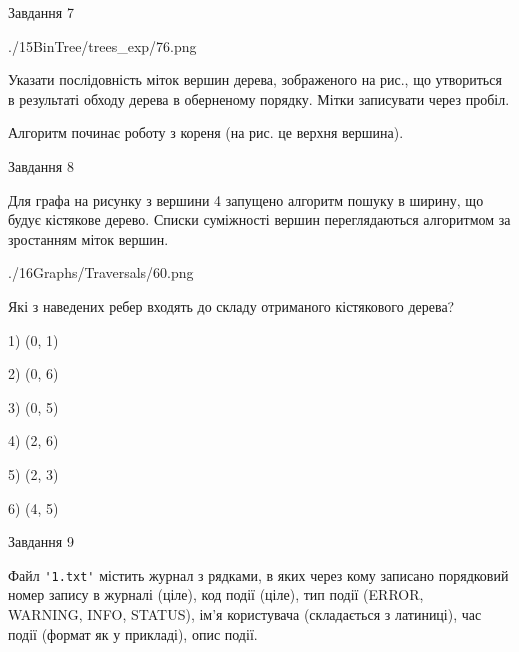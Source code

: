 \documentclass[12pt, ukrainian]{article}
\def\code#1{\Verb!#1!}
\begin{document}
{\vspace{10mm}\par

\newpage
\begin{minipage}[t]{9.7cm}
               
{\begin{center}Завдання {7}\end{center}}
\vspace{-6mm}

\begin{center}
	{./15BinTree/trees_exp/76.png}
\end{center}
Указати послідовність міток вершин дерева, зображеного на рис., що утвориться в результаті обходу дерева в оберненому порядку. Мітки записувати через пробіл.\par Алгоритм починає роботу з кореня (на рис. це верхня вершина).\par

\end{minipage}
\vline \hspace{8mm}
\begin{minipage}[t]{8.0cm}
               
{\begin{center}Завдання {8}\end{center}}
\vspace{-6mm}
Для графа на рисунку з вершини 4 запущено алгоритм пошуку в ширину, що будує кістякове дерево. Списки суміжності вершин переглядаються алгоритмом за зростанням міток вершин.\par
\begin{center}
	{./16Graphs/Traversals/60.png}
\end{center}
\par Які з наведених ребер входять до складу отриманого кістякового дерева?\par
1) (0, 1)\par
2) (0, 6)\par
3) (0, 5)\par
4) (2, 6)\par
5) (2, 3)\par
6) (4, 5)\par
{\vskip 15pt} \par

\end{minipage}

               
{\begin{center}Завдання {9}\end{center}}
\vspace{-6mm}
Файл \code{'1.txt'} містить журнал з рядками, в яких через кому записано поряд\-ко\-вий номер запису в журналі (ціле), код події (ціле), тип події (ERROR, \\WARNING, INFO, STATUS), ім'я користувача (складається з латиниці), час події (фор\-мат як у прикладі), опис події.

}
\end{document}
